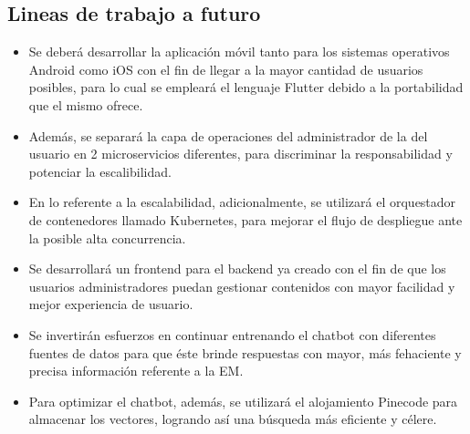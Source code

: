 \subsection{Lineas de trabajo a futuro}

\begin{itemize}
\item Se deberá desarrollar la aplicación móvil tanto para los sistemas operativos Android como iOS con el fin de llegar a la mayor cantidad de usuarios posibles, para lo cual se empleará el lenguaje Flutter debido a la portabilidad que el mismo ofrece.

\item Además, se separará la capa de operaciones del administrador de la del usuario en 2 microservicios diferentes, para discriminar la responsabilidad y potenciar la escalibilidad.

\item En lo referente a la escalabilidad, adicionalmente, se utilizará el orquestador de contenedores llamado Kubernetes, para mejorar el flujo de despliegue ante la posible alta concurrencia.

\item Se desarrollará un frontend para el backend ya creado con el fin de que los usuarios administradores puedan gestionar contenidos con mayor facilidad y mejor experiencia de usuario.

\item Se invertirán esfuerzos en continuar entrenando el chatbot con diferentes fuentes de datos para que éste brinde respuestas con mayor, más fehaciente y precisa información referente a la EM.

\item  Para optimizar el chatbot, además, se utilizará el alojamiento Pinecode para almacenar los vectores, logrando así una búsqueda más eficiente y célere.
\end{itemize}